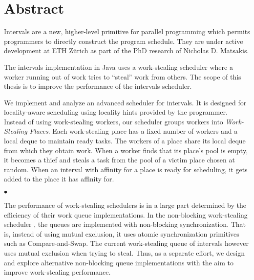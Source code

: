 
\chapter*{Abstract}
\label{chap:abstract}

Intervals are a new, higher-level primitive for parallel programming
which permits programmers to directly construct the program
schedule. They are under active development at ETH Zürich as part of
the PhD research of Nicholas D. Matsakis.

The intervals implementation in Java uses a work-stealing scheduler
where a worker running out of work tries to ``steal'' work from
others. The scope of this thesis is to improve the performance of the
intervals scheduler.

We implement and analyze an advanced scheduler for intervals. It is
designed for locality-aware scheduling using locality hints provided
by the programmer. Instead of using work-stealing workers, our
scheduler groups workers into \emph{Work-Stealing Places}.  Each
work-stealing place has a fixed number of workers and a local deque to
maintain ready tasks. The workers of a place share its local deque
from which they obtain work. When a worker finds that its place's pool
is empty, it becomes a thief and steals a task from the pool of a
victim place chosen at random. When an interval with affinity for a
place is ready for scheduling, it gets added to the place it has
affinity for.

\begin{center}
  $\bullet$
\end{center}

The performance of work-stealing schedulers is in a large part
determined by the efficiency of their work queue implementations. In
the non-blocking work-stealing scheduler \cite{Arora1998}, the queues
are implemented with non-blocking synchronization. That is, instead of
using mutual exclusion, it uses atomic synchronization primitives such
as Compare-and-Swap. The current work-stealing queue of intervals
however uses mutual exclusion when trying to steal. Thus, as a
separate effort, we design and explore alternative non-blocking queue
implementations with the aim to improve work-stealing performance.


